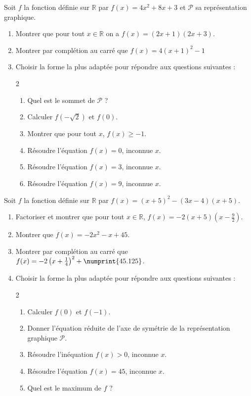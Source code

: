 \documentclass[main.tex]{subfiles}
\begin{document}
\begin{exercise} Soit $f$ la fonction définie sur $\mathbb{R}$ par $f(x) =4x^2+8x+3$ et $\mathscr{P}$ sa représentation graphique.
	\begin{enumerate}[leftmargin=*,label=\arabic*)]
		\item Montrer que pour tout $x\in\mathbb{R}$ on a $f(x)=(2x+1)(2x+3)$.
		\item Montrer par complétion au carré que $f(x)=4\left(x+1 \right)^2 -1 $
		\item Choisir la forme la plus adaptée pour répondre aux questions suivantes :
		\vspace{-1em}
		\begin{multicols}{2}
			\begin{enumerate}[leftmargin=*,label=\alph*)]
				\item Quel est le sommet de $\mathscr{P}$ ?
				\item Calculer $f(-\sqrt{2})$ et $f(0)$.
				\item Montrer que pour tout $x$, $f(x)\geqslant -1$.
				\item Résoudre l'équation $f(x)=0$, inconnue $x$.
				\item Résoudre l'équation $f(x)=3$, inconnue $x$.
				\item Résoudre l'équation $f(x)=9$, inconnue $x$.  
			\end{enumerate} 
		\end{multicols}
	\end{enumerate} 
\end{exercise}
\begin{exercise} Soit $f$ la fonction définie sur $\mathbb{R}$ par $f(x) =(x+5)^2-(3x-4)(x+5)$.
	\begin{enumerate}[leftmargin=*,label=\arabic*)] 
		\item Factoriser et montrer que pour tout $x\in\mathbb{R}$, $f(x)=-2(x+5)(x-\tfrac{9}{2})$.
		\item Montrer que $f(x)=-2x^2-x+45$.
		\item Montrer par complétion au carré que $f(x)=-2\left(x+\frac{1}{4} \right)^2 +\numprint{45.125}$. 
		\item Choisir la forme la plus adaptée pour répondre aux questions suivantes : 
		\vspace{-1em}
		\begin{multicols}{2}
			\begin{enumerate}[leftmargin=*,label=\alph*)]
				\item Calculer $f(0)$ et $f(-1)$.
				\item Donner l'équation réduite de l'axe de symétrie de la représentation graphique $\mathscr{P}$. 
				\item Résoudre l'inéquation $f(x)>0$, inconnue $x$.
				\item Résoudre l'équation $f(x)=45$, inconnue $x$.
				\item Quel est le maximum de $f$ ? 
			\end{enumerate} 
		\end{multicols}
	\end{enumerate} 
\end{exercise}
\end{document}
